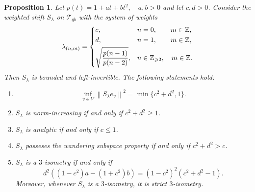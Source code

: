 \documentclass[11pt, reqno, a4paper]{amsart}
\newtheorem{proposition}[theorem]{Proposition}
\theoremstyle{definition}
\newcommand{\scrT}{{\mathscr T}}
\newcommand{\norm}[1]{\left\lVert #1 \right\rVert}
\renewcommand{\le}{\leqslant}
\renewcommand{\ge}{\geqslant}
\newcommand{\Z}{\mathbb Z}
\numberwithin{equation}{section}
\begin{document}
    \begin{proposition}
        \label{prop:classify-3-isometries}
        Let $p (t) =  1 + a t + b t^2, \quad a, b >0$ and let $c,d >0$. Consider the weighted shift $S_{\lambda}$ on $\scrT_{qb}$ with the system of weights
            \begin{equation}
        \label{eq:CS-weights-3-isometry}
        \begin{gathered}
            \lambda_{(n,m)} = \begin{dcases}
                c, & n=0, \quad\quad m\in \Z, \\
                d, & n=1, \quad\quad m\in \Z, \\ 
                \sqrt{\frac{p(n-1)}{p(n-2)}}, & n \in \Z_{\ge 2},\quad m \in \Z.
            \end{dcases}
        \end{gathered}
    \end{equation}
    Then $S_{\lambda}$ is bounded and left-invertible. The following statements hold:
    \begin{enumerate}
        \item[\rm (i)] \begin{equation*}
            \inf_{v \in V} \norm{S_{\lambda} e_v}^{2} = \min \{ c^2 + d^2, 1 \}.
        \end{equation*}
        \item[\rm (ii)] $S_{\lambda}$ is norm-increasing if and only if $c^2 + d^2 \ge 1$.
        \item[\rm (iii)] $S_\lambda$ is analytic if and only if $c \le 1$.
        \item[\rm (iv)] $S_{\lambda}$ posseses the wandering subspace property if and only if $c^2 + d^2 > c$.
        \item[\rm (v)] $S_{\lambda}$ is a $3$-isometry if and only if
        \begin{equation*}
            d^2 ((1-c^2)a - (1+c^2)b) = (1-c^2)^{2} (c^2 + d^2 -1).
        \end{equation*}
        Moreover, whenever $S_\lambda$ is a $3$-isometry, it is strict $3$-isometry.
    \end{enumerate}
    \end{proposition}
\end{document}

